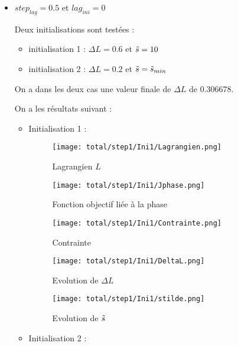 \documentclass[11pt,a4paper]{article}
\begin{document}
\begin{itemize}
	\item $step_{lag}=0.5$ et $lag_{ini}=0$ 
	
	
	Deux initialisations sont testées :
	\begin{itemize}
		\item initialisation 1 : $\Delta L=0.6$ et $\tilde{s}=10$
		\item initialisation 2 : $\Delta L=0.2$ et $\tilde{s}=\tilde{s}_{min}$
	\end{itemize}
	On a dans les deux cas une valeur finale de $\Delta L$ de 0.306678. 
	
	\vspace{0cm}
	
	On a les résultats suivant :
	
	\begin{itemize}
		\item Initialisation 1 :
		
		\begin{figure}[H]
			\begin{minipage}{0.33\textwidth}
				\centering
				\texttt{[image: total/step1/Ini1/Lagrangien.png]}
				\caption{Lagrangien $L$}
			\end{minipage}
			\begin{minipage}{0.33\textwidth}
				\centering
				\texttt{[image: total/step1/Ini1/Jphase.png]}
				\caption{Fonction objectif liée à la phase}
			\end{minipage}
			\begin{minipage}{0.33\textwidth}
				\centering
				\texttt{[image: total/step1/Ini1/Contrainte.png]}
				\caption{Contrainte}
			\end{minipage}
		\end{figure}
		
		\begin{figure}[H]
			\begin{minipage}{0.45\textwidth}
				\centering
				\texttt{[image: total/step1/Ini1/DeltaL.png]}
				\caption{Evolution de $\Delta L$}
			\end{minipage}
			\begin{minipage}{0.45\textwidth}
				\centering
				\texttt{[image: total/step1/Ini1/stilde.png]}
				\caption{Evolution de $\tilde{s}$}
			\end{minipage}
		\end{figure}
		
		\item Initialisation 2 :
		

\end{itemize}
\end{itemize}
\end{document}
